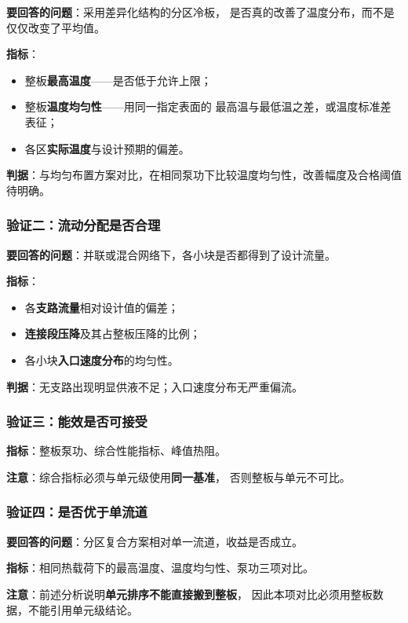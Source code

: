\documentclass[stage2,fontset=fandol]{ydzjreport}
\begin{document}
\textbf{要回答的问题}：采用差异化结构的分区冷板，
是否真的改善了温度分布，而不是仅仅改变了平均值。

\textbf{指标}：
\begin{itemize}
  \item 整板\textbf{最高温度}——是否低于允许上限；
  \item 整板\textbf{温度均匀性}——用同一指定表面的
        最高温与最低温之差，或温度标准差表征；
  \item 各区\textbf{实际温度}与设计预期的偏差。
\end{itemize}

\textbf{判据}：与均匀布置方案对比，在相同泵功下比较温度均匀性，改善幅度及合格阈值待明确。

\subsubsection{验证二：流动分配是否合理}

\textbf{要回答的问题}：并联或混合网络下，各小块是否都得到了设计流量。

\textbf{指标}：
\begin{itemize}
  \item 各\textbf{支路流量}相对设计值的偏差；
  \item \textbf{连接段压降}及其占整板压降的比例；
  \item 各小块\textbf{入口速度分布}的均匀性。
\end{itemize}

\textbf{判据}：无支路出现明显供液不足；入口速度分布无严重偏流。

\subsubsection{验证三：能效是否可接受}

\textbf{指标}：整板泵功、综合性能指标、峰值热阻。

\textbf{注意}：综合指标必须与单元级使用\textbf{同一基准}，
否则整板与单元不可比。

\subsubsection{验证四：是否优于单流道}

\textbf{要回答的问题}：分区复合方案相对单一流道，收益是否成立。

\textbf{指标}：相同热载荷下的最高温度、温度均匀性、泵功三项对比。

\textbf{注意}：前述分析说明\textbf{单元排序不能直接搬到整板}，
因此本项对比必须用整板数据，不能引用单元级结论。
\end{document}
